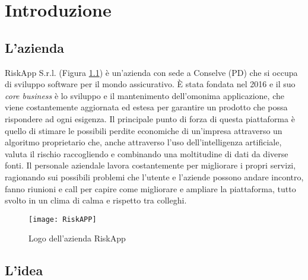 \chapter{Introduzione}
\label{cap:introduzione}

%
%
%

\section{L'azienda}

RiskApp S.r.l. (Figura \ref{fig:riskapp}) è un'azienda con sede a Conselve (PD) che si occupa di sviluppo software per il mondo assicurativo.\newline
È stata fondata nel 2016 e il suo \textit{core business} è lo sviluppo e il mantenimento dell'omonima applicazione, che viene costantemente aggiornata ed estesa per garantire un prodotto che possa rispondere ad ogni esigenza.\newline
Il principale punto di forza di questa piattaforma è quello di stimare le possibili perdite economiche di un’impresa attraverso un algoritmo proprietario che, anche attraverso l’uso dell'intelligenza artificiale, valuta il rischio raccogliendo e combinando una moltitudine di dati da diverse fonti.\newline
Il personale aziendale lavora costantemente per migliorare i propri servizi, ragionando sui possibili problemi che l'utente e l'aziende possono andare incontro, fanno riunioni e call per capire come migliorare e ampliare la piattaforma, tutto svolto in un clima di calma e rispetto tra colleghi.

\begin{figure}[!h] 
    \centering 
    \texttt{[image: RiskAPP]} 
    \caption{Logo dell'azienda RiskApp}\label{fig:riskapp}
\end{figure}

\section{L'idea}

